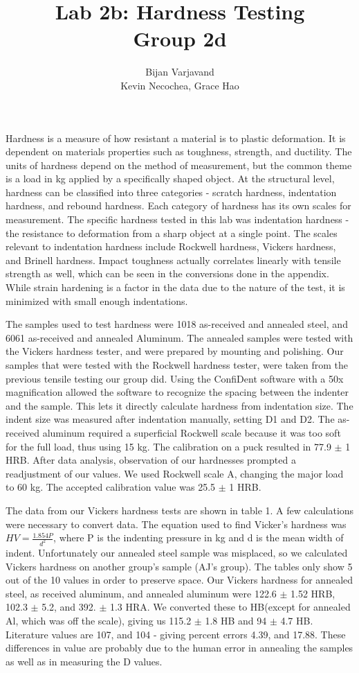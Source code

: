 \documentclass{article}
\author{Bijan Varjavand\\ Kevin Necochea, Grace Hao}
\title{Lab 2b: Hardness Testing\\Group 2d}
\begin{document}
\maketitle

\clearpage

Hardness is a measure of how resistant a material is to plastic deformation. It is dependent on materials properties such as toughness, strength, and ductility. The units of hardness depend on the method of measurement, but the common theme is a load in kg applied by a specifically shaped object. At the structural level, hardness can be classified into three categories - scratch hardness, indentation hardness, and rebound hardness. Each category of hardness has its own scales for measurement. The specific hardness tested in this lab was indentation hardness - the resistance to deformation from a sharp object at a single point. The scales relevant to indentation hardness include Rockwell hardness, Vickers hardness, and Brinell hardness. Impact toughness actually correlates linearly with tensile strength as well, which can be seen in the conversions done in the appendix. While strain hardening is a factor in the data due to the nature of the test, it is minimized with small enough indentations.

The samples used to test hardness were 1018 as-received and annealed steel, and 6061 as-received and annealed Aluminum. The annealed samples were tested with the Vickers hardness tester, and were prepared by mounting and polishing. Our samples that were tested with the Rockwell hardness tester, were taken from the previous tensile testing our group did. Using the ConfiDent software with a 50x magnification allowed the software to recognize the spacing between the indenter and the sample. This lets it directly calculate hardness from indentation size. The indent size was measured after indentation manually, setting D1 and D2. The as-received aluminum required a superficial Rockwell scale because it was too soft for the full load, thus using 15 kg. The calibration on a puck resulted in 77.9 $\pm$ 1 HRB. After data analysis, observation of our hardnesses prompted a readjustment of our values. We used Rockwell scale A, changing the major load to 60 kg. The accepted calibration value was 25.5 $\pm$ 1 HRB.

The data from our Vickers hardness tests are shown in table 1. A few calculations were necessary to convert data. The equation used to find Vicker's hardness was $HV=\frac{1.854P}{d^2}$, where P is the indenting pressure in kg and d is the mean width of indent. Unfortunately our annealed steel sample was misplaced, so we calculated Vickers hardness on another group's sample (AJ's group). The tables only show 5 out of the 10 values in order to preserve space. Our Vickers hardness for annealed steel, as received aluminum, and annealed aluminum were 122.6 $\pm$ 1.52 HRB, 102.3 $\pm$ 5.2, and 392. $\pm$ 1.3 HRA. We converted these to HB(except for annealed Al, which was off the scale), giving us 115.2 $\pm$ 1.8 HB and 94 $\pm$ 4.7 HB. Literature values are 107, and 104 - giving percent errors 4.39, and 17.88. These differences in value are probably due to the human error in annealing the samples as well as in measuring the D values.
\end{document}
